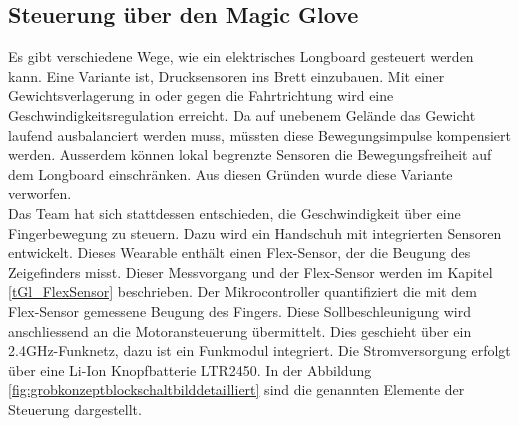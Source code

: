 \subsection*{Steuerung über den Magic Glove}
Es gibt verschiedene Wege, wie ein elektrisches Longboard gesteuert werden kann. 
Eine Variante ist, Drucksensoren ins Brett einzubauen.
Mit einer Gewichtsverlagerung in oder gegen die Fahrtrichtung wird eine Geschwindigkeitsregulation erreicht. Da auf unebenem Gelände das Gewicht laufend ausbalanciert werden muss, müssten diese Bewegungsimpulse kompensiert werden. Ausserdem können lokal begrenzte Sensoren die Bewegungsfreiheit auf dem Longboard einschränken.
Aus diesen Gründen wurde diese Variante verworfen. \\
Das Team hat sich stattdessen entschieden, die Geschwindigkeit über eine Fingerbewegung zu steuern. Dazu wird ein Handschuh mit integrierten Sensoren entwickelt. Dieses Wearable enthält einen Flex-Sensor, der die Beugung des Zeigefinders misst. Dieser Messvorgang und der Flex-Sensor werden im Kapitel \ref{tGl_FlexSensor} beschrieben. Der Mikrocontroller quantifiziert die mit dem Flex-Sensor gemessene Beugung des Fingers.
Diese Sollbeschleunigung wird anschliessend an die Motoransteuerung übermittelt. Dies geschieht über ein 2.4GHz-Funknetz, dazu ist ein Funkmodul integriert. Die Stromversorgung erfolgt über eine Li-Ion Knopfbatterie LTR2450. In der Abbildung \ref{fig:grobkonzeptblockschaltbilddetailliert} sind die genannten Elemente der Steuerung dargestellt.

